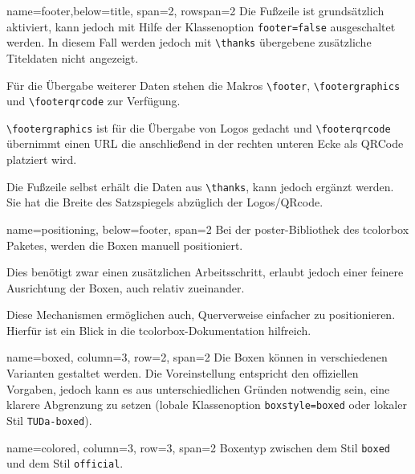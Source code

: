 \documentclass[
	accentcolor=9c,
	]{tudasciposter}
\newcommand{\tbs}{\textbackslash}
\let\code\texttt
\newcommand*{\macro}[1]{\code{\tbs#1}}
\let\pck\textsf
\begin{document}
\begin{tcbposter}[
		poster={
			columns=4,
			rows=7,
			spacing=1cm,
		},]
	\begin{posterboxenv}[title=Fußzeile]{name=footer,below=title, span=2, rowspan=2 }
		Die Fußzeile ist grundsätzlich aktiviert, kann jedoch mit Hilfe der Klassenoption \code{footer=false} ausgeschaltet werden. In diesem Fall werden jedoch mit \macro{thanks} übergebene zusätzliche Titeldaten nicht angezeigt.

		Für die Übergabe weiterer Daten stehen die Makros \macro{footer}, \macro{footergraphics} und \macro{footerqrcode} zur Verfügung.

		\macro{footergraphics} ist für die Übergabe von Logos gedacht und \macro{footerqrcode} übernimmt einen URL die anschließend in der rechten unteren Ecke als QRCode platziert wird.

		Die Fußzeile selbst erhält die Daten aus \macro{thanks}, kann jedoch ergänzt werden. Sie hat die Breite des Satzspiegels abzüglich der Logos/QRcode.
	\end{posterboxenv}

	\begin{posterboxenv}[title=Platzierung der Boxen]{name=positioning, below=footer, span=2}
		Bei der \pck{poster}-Bibliothek des \pck{tcolorbox} Paketes, werden die Boxen manuell positioniert.

		Dies benötigt zwar einen zusätzlichen Arbeitsschritt, erlaubt jedoch einer feinere Ausrichtung der Boxen, auch relativ zueinander.

		Diese Mechanismen ermöglichen auch, Querverweise einfacher zu positionieren. Hierfür ist ein Blick in die \pck{tcolorbox}-Dokumentation hilfreich.
	\end{posterboxenv}

	\begin{posterboxenv}[title=Eine Box im Stil TUDa-boxed, TUDa-boxed]{name=boxed, column=3, row=2, span=2}
		Die Boxen können in verschiedenen Varianten gestaltet werden. Die Voreinstellung entspricht den offiziellen Vorgaben, jedoch kann es aus unterschiedlichen Gründen notwendig sein, eine klarere Abgrenzung zu setzen (lobale Klassenoption \code{boxstyle=boxed} oder lokaler Stil \code{TUDa-boxed}).
	\end{posterboxenv}

	\begin{posterboxenv}[title=Eine Box im Stil TUDa-colored, TUDa-colored]{name=colored, column=3, row=3, span=2}
		Boxentyp zwischen dem Stil \code{boxed} und dem Stil \code{official}.


\end{posterboxenv}
\end{tcbposter}
\end{document}
